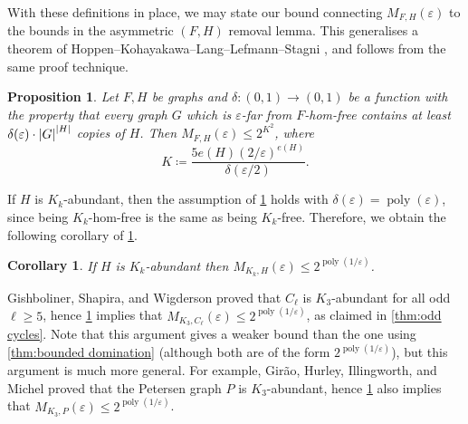 \documentclass[reqno, english, 12pt]{amsart}
\theoremstyle{plain}
\newtheorem{proposition}[theorem]{Proposition}
\newtheorem{corollary}[theorem]{Corollary}
\theoremstyle{remark}
\DeclareMathOperator{\poly}{poly}
\DeclarePairedDelimiter{\abs}{\lvert}{\rvert}
\renewcommand{\leq}{\leqslant}
\renewcommand{\geq}{\geqslant}
\newcommand{\e}{\ensuremath{\varepsilon}}
\begin{document}
 
With these definitions in place, we may state our bound connecting $M_{F,H}(\varepsilon)$ to the bounds in the asymmetric $(F,H)$ removal lemma. This generalises a theorem of Hoppen--Kohayakawa--Lang--Lefmann--Stagni \cite[Theorem 1.4]{MR4132523}, and follows from the same proof technique.
\begin{proposition}\label{prop:exponential approx hom}
	Let $F,H$ be graphs and $\delta:(0,1) \to (0,1)$ be a function  with the property that every graph $G$ which is $\varepsilon$-far from $F$-hom-free contains at least $\delta(\varepsilon)\cdot {\abs G}^{\abs H}$ copies of $H$.
	Then $M_{F,H}(\varepsilon) \leq 2^{K^2}$, where 
	\begin{equation}\label{eq:Frieze-Kannan m}
	K \coloneqq \frac{5e(H)(2/\e)^{e(H)}}{\delta(\varepsilon/2)}.
	\end{equation}
\end{proposition}
If $H$ is $K_k$-abundant, then the assumption of \cref{prop:exponential approx hom} holds with $\delta(\varepsilon) = \poly(\varepsilon)$, since being $K_k$-hom-free is the same as being $K_k$-free. Therefore, we obtain the following corollary of \cref{prop:exponential approx hom}.
\begin{corollary}
	If $H$ is $K_k$-abundant then $M_{K_k,H}(\varepsilon) \leq 2^{\poly(1/\varepsilon)}$.
\end{corollary}
Gishboliner, Shapira, and Wigderson \cite{GSW} proved that $C_\ell$ is $K_3$-abundant for all odd $\ell \geq 5$, hence \cref{prop:exponential approx hom} implies that $M_{K_3,C_\ell}(\varepsilon) \leq 2^{\poly(1/\varepsilon)}$, as claimed in \cref{thm:odd cycles}. Note that this argument gives a weaker bound than the one using \cref{thm:bounded domination} (although both are of the form $2^{\poly(1/\varepsilon)}$), but this argument is much more general. For example, Gir\~ao, Hurley, Illingworth, and Michel \cite{GHIM} proved that the Petersen graph $P$ is $K_3$-abundant, hence \cref{prop:exponential approx hom} also implies that $M_{K_3,P}(\varepsilon) \leq 2^{\poly(1/\varepsilon)}$.
\end{document}

